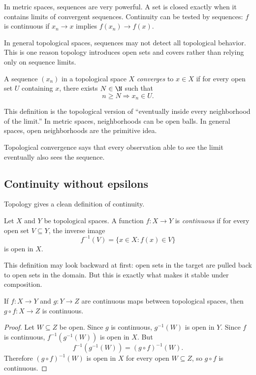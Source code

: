 In metric spaces, sequences are very powerful. A set is closed exactly when it
contains limits of convergent sequences. Continuity can be tested by sequences:
$f$ is continuous if $x_n\to x$ implies $f(x_n)\to f(x)$.

In general topological spaces, sequences may not detect all topological
behavior. This is one reason topology introduces open sets and covers rather
than relying only on sequence limits.

\begin{definition}
A sequence $(x_n)$ in a topological space $X$ \emph{converges} to $x\in X$ if
for every open set $U$ containing $x$, there exists $N\in\N$ such that
\[
n\geq N\Rightarrow x_n\in U.
\]
\end{definition}

This definition is the topological version of ``eventually inside every
neighborhood of the limit.'' In metric spaces, neighborhoods can be open balls.
In general spaces, open neighborhoods are the primitive idea.

\begin{intuitionbox}
Topological convergence says that every observation able to see the limit
eventually also sees the sequence.
\end{intuitionbox}

\subsection{Continuity without epsilons}

Topology gives a clean definition of continuity.

\begin{definition}
Let $X$ and $Y$ be topological spaces. A function $f:X\to Y$ is
\emph{continuous} if for every open set $V\subseteq Y$, the inverse image
\[
f^{-1}(V)=\{x\in X:f(x)\in V\}
\]
is open in $X$.
\end{definition}

This definition may look backward at first: open sets in the target are pulled
back to open sets in the domain. But this is exactly what makes it stable under
composition.

\begin{theorem}
If $f:X\to Y$ and $g:Y\to Z$ are continuous maps between topological spaces,
then $g\circ f:X\to Z$ is continuous.
\end{theorem}

\begin{proof}
Let $W\subseteq Z$ be open. Since $g$ is continuous, $g^{-1}(W)$ is open in
$Y$. Since $f$ is continuous, $f^{-1}(g^{-1}(W))$ is open in $X$. But
\[
f^{-1}(g^{-1}(W))=(g\circ f)^{-1}(W).
\]
Therefore $(g\circ f)^{-1}(W)$ is open in $X$ for every open $W\subseteq Z$,
so $g\circ f$ is continuous.
\end{proof}

